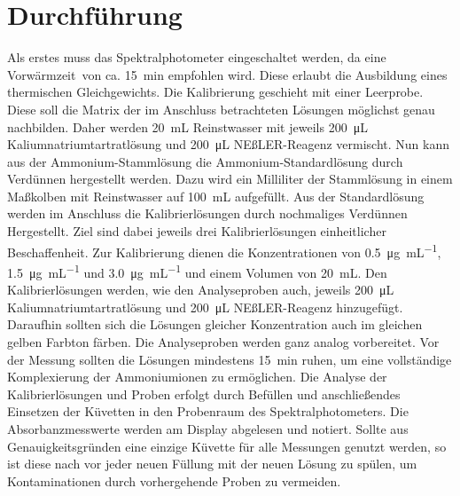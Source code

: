 \section{Durchführung}
\label{sec:durchfuerung}
Als erstes muss das Spektralphotometer eingeschaltet werden, da eine \glqq Vorwärmzeit\grqq\, von ca. \SI{15}{\minute} empfohlen wird. Diese erlaubt die Ausbildung eines thermischen Gleichgewichts. Die Kalibrierung geschieht mit einer Leerprobe. Diese soll die Matrix der im Anschluss betrachteten Lösungen möglichst genau nachbilden. Daher werden \SI{20}{\milli\liter} Reinstwasser mit jeweils \SI{200}{\micro\liter} Kaliumnatriumtartratlösung und \SI{200}{\micro\liter} NEßLER-Reagenz vermischt. Nun kann aus der Ammonium-Stammlösung die Ammonium-Standardlösung durch Verdünnen hergestellt werden. Dazu wird ein Milliliter der Stammlösung in einem Maßkolben mit Reinstwasser auf \SI{100}{\milli\liter} aufgefüllt. Aus der Standardlösung werden im Anschluss die Kalibrierlösungen durch nochmaliges Verdünnen Hergestellt. Ziel sind dabei jeweils drei Kalibrierlösungen einheitlicher Beschaffenheit. Zur Kalibrierung dienen die Konzentrationen von \SI{0,5}{\micro\gram\per\milli\liter}, \SI{1,5}{\micro\gram\per\milli\liter} und \SI{3,0}{\micro\gram\per\milli\liter} und einem Volumen von \SI{20}{\milli\liter}. Den Kalibrierlösungen werden, wie den Analyseproben auch, jeweils \SI{200}{\micro\liter} Kaliumnatriumtartratlösung und \SI{200}{\micro\liter} NEßLER-Reagenz hinzugefügt. Daraufhin sollten sich die Lösungen gleicher Konzentration auch im gleichen gelben Farbton färben. Die Analyseproben werden ganz analog vorbereitet. Vor der Messung sollten die Lösungen mindestens \SI{15}{\minute} ruhen, um eine vollständige Komplexierung der Ammoniumionen zu ermöglichen. Die Analyse der Kalibrierlösungen und Proben erfolgt durch Befüllen und anschließendes Einsetzen der Küvetten in den Probenraum des Spektralphotometers. Die Absorbanzmesswerte werden am Display abgelesen und notiert. 
Sollte aus Genauigkeitsgründen eine einzige Küvette für alle Messungen genutzt werden, so ist diese nach vor jeder neuen Füllung mit der neuen Lösung zu spülen, um Kontaminationen durch vorhergehende Proben zu vermeiden.